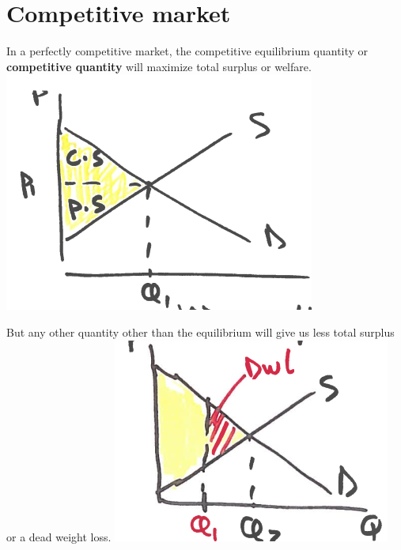 \documentclass[../ECON-281-Notes.tex]{subfiles}
\begin{document}
\newpage

\section{Competitive market}
In a perfectly competitive market, the competitive equilibrium quantity or \textbf{competitive quantity} will maximize total surplus or welfare.
\includegraphics[width=\columnwidth]{assets/image-2021-12-11-12-18-36.png}

But any other quantity other than the equilibrium will give us less total surplus or a dead weight loss.
\includegraphics[width=\columnwidth]{assets/image-2021-12-11-12-18-54.png}
\end{document}
